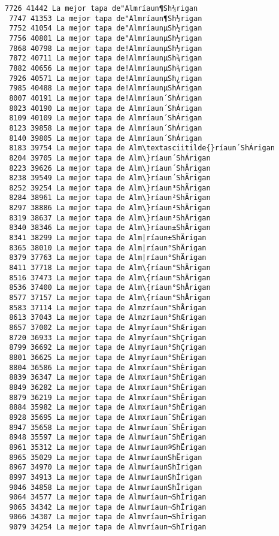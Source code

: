 \documentclass[11pt]{article}
\begin{document}
\begin{Verbatim}[commandchars=\\\{\}]
 7726 41442 La mejor tapa de"Almríaun¶Sh¼rigan
 7747 41353 La mejor tapa de"Almríaun¶Sh½rigan
 7752 41054 La mejor tapa de"AlmríaunµSh½rigan
 7756 40801 La mejor tapa de"AlmríaunµSh½rigan
 7868 40798 La mejor tapa de!AlmríaunµSh½rigan
 7872 40711 La mejor tapa de!AlmríaunµSh¾rigan
 7882 40656 La mejor tapa de!AlmríaunµSh¾rigan
 7926 40571 La mejor tapa de!AlmríaunµSh¿rigan
 7985 40488 La mejor tapa de!AlmríaunµShÀrigan
 8007 40191 La mejor tapa de!Almríaun´ShÀrigan
 8023 40190 La mejor tapa de Almríaun´ShÀrigan
 8109 40109 La mejor tapa de Almríaun´ShÁrigan
 8123 39858 La mejor tapa de Almríaun´ShÁrigan
 8140 39805 La mejor tapa de Almríaun´ShÁrigan
 8183 39754 La mejor tapa de Alm\textasciitilde{}ríaun´ShÁrigan
 8204 39705 La mejor tapa de Alm\}ríaun´ShÁrigan
 8223 39626 La mejor tapa de Alm\}ríaun´ShÂrigan
 8238 39549 La mejor tapa de Alm\}ríaun´ShÃrigan
 8252 39254 La mejor tapa de Alm\}ríaun³ShÃrigan
 8284 38961 La mejor tapa de Alm\}ríaun²ShÃrigan
 8297 38886 La mejor tapa de Alm\}ríaun²ShÄrigan
 8319 38637 La mejor tapa de Alm\}ríaun²ShÄrigan
 8340 38346 La mejor tapa de Alm\}ríaun±ShÄrigan
 8341 38299 La mejor tapa de Alm|ríaun±ShÄrigan
 8365 38010 La mejor tapa de Alm|ríaun°ShÄrigan
 8379 37763 La mejor tapa de Alm|ríaun°ShÄrigan
 8411 37718 La mejor tapa de Alm\{ríaun°ShÄrigan
 8516 37473 La mejor tapa de Alm\{ríaun°ShÄrigan
 8536 37400 La mejor tapa de Alm\{ríaun°ShÅrigan
 8577 37157 La mejor tapa de Alm\{ríaun°ShÅrigan
 8583 37114 La mejor tapa de Almzríaun°ShÅrigan
 8613 37043 La mejor tapa de Almzríaun°ShÆrigan
 8657 37002 La mejor tapa de Almyríaun°ShÆrigan
 8720 36933 La mejor tapa de Almyríaun°ShÇrigan
 8799 36692 La mejor tapa de Almyríaun°ShÇrigan
 8801 36625 La mejor tapa de Almyríaun°ShÈrigan
 8804 36586 La mejor tapa de Almxríaun°ShÈrigan
 8839 36347 La mejor tapa de Almxríaun°ShÈrigan
 8849 36282 La mejor tapa de Almxríaun°ShÉrigan
 8879 36219 La mejor tapa de Almxríaun°ShÊrigan
 8884 35982 La mejor tapa de Almxríaun°ShÊrigan
 8928 35695 La mejor tapa de Almxríaun¯ShÊrigan
 8947 35658 La mejor tapa de Almwríaun¯ShÊrigan
 8948 35597 La mejor tapa de Almwríaun¯ShËrigan
 8961 35312 La mejor tapa de Almwríaun®ShËrigan
 8965 35029 La mejor tapa de Almwríaun­ShËrigan
 8967 34970 La mejor tapa de Almwríaun­ShÌrigan
 8997 34913 La mejor tapa de Almwríaun­ShÍrigan
 9046 34858 La mejor tapa de Almwríaun­ShÎrigan
 9064 34577 La mejor tapa de Almwríaun¬ShÎrigan
 9065 34342 La mejor tapa de Almwríaun¬ShÎrigan
 9066 34307 La mejor tapa de Almvríaun¬ShÎrigan
 9079 34254 La mejor tapa de Almvríaun¬ShÏrigan

\end{Verbatim}
\end{document}
